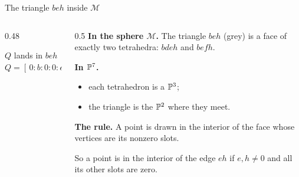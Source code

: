 \begin{frame}{The triangle \(beh\) inside \(\mathcal M\)}
\begin{columns}[c]
\begin{column}{0.48\textwidth}
\centering
{}
\par\smallskip
\(Q\) lands in \(beh\)\\[3pt]
\(Q=[\,0:b:0:0:e:0:0:h\,]\)
\end{column}
\begin{column}{0.5\textwidth}
\textbf{In the sphere \(\mathcal M\).} The triangle \(beh\) (grey) is a face of exactly two tetrahedra: \(bdeh\) and \(befh\).
\par\medskip
\textbf{In \(\mathbb P^7\).}
\begin{itemize}
\setlength{\itemsep}{6pt}
\item each tetrahedron is a \(\mathbb P^3\);
\item the triangle is the \(\mathbb P^2\) where they meet.
\end{itemize}
\par\medskip
\textbf{The rule.} A point is drawn in the interior of the face whose vertices are its nonzero slots.
\par\medskip
So a point is in the interior of the edge \(eh\) if \(e,h\ne0\) and all its other slots are zero.
\end{column}
\end{columns}
\src{\textcolor{red}{The explanation of the rule is left for later.}}
\end{frame}

